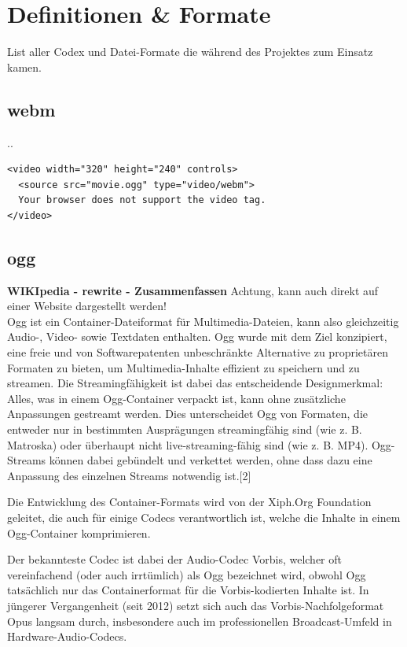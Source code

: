 \newpage
\section{Definitionen \& Formate}
List aller Codex und Datei-Formate die während des Projektes zum Einsatz kamen.

\subsection{webm}
..

\begin{verbatim}
<video width="320" height="240" controls>
  <source src="movie.ogg" type="video/webm">
  Your browser does not support the video tag.
</video> 
\end{verbatim}

\subsection{ogg}

\textbf{WIKIpedia - rewrite - Zusammenfassen}
Achtung, kann auch direkt auf einer Website dargestellt werden!\\

Ogg ist ein Container-Dateiformat für Multimedia-Dateien, kann also gleichzeitig Audio-, Video- sowie Textdaten enthalten. Ogg wurde mit dem Ziel konzipiert, eine freie und von Softwarepatenten unbeschränkte Alternative zu proprietären Formaten zu bieten, um Multimedia-Inhalte effizient zu speichern und zu streamen. Die Streamingfähigkeit ist dabei das entscheidende Designmerkmal: Alles, was in einem Ogg-Container verpackt ist, kann ohne zusätzliche Anpassungen gestreamt werden. Dies unterscheidet Ogg von Formaten, die entweder nur in bestimmten Ausprägungen streamingfähig sind (wie z. B. Matroska) oder überhaupt nicht live-streaming-fähig sind (wie z. B. MP4). Ogg-Streams können dabei gebündelt und verkettet werden, ohne dass dazu eine Anpassung des einzelnen Streams notwendig ist.[2]

Die Entwicklung des Container-Formats wird von der Xiph.Org Foundation geleitet, die auch für einige Codecs verantwortlich ist, welche die Inhalte in einem Ogg-Container komprimieren.

Der bekannteste Codec ist dabei der Audio-Codec Vorbis, welcher oft vereinfachend (oder auch irrtümlich) als Ogg bezeichnet wird, obwohl Ogg tatsächlich nur das Containerformat für die Vorbis-kodierten Inhalte ist. In jüngerer Vergangenheit (seit 2012) setzt sich auch das Vorbis-Nachfolgeformat Opus langsam durch, insbesondere auch im professionellen Broadcast-Umfeld in Hardware-Audio-Codecs. 



